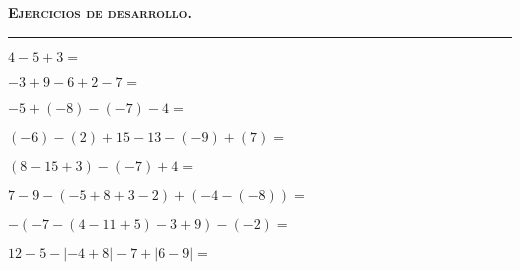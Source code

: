 \documentclass[spanish,letterpaper, 12pt, addpoints, answers]{exam}
\begin{document}
\parbox{16cm}{
{\textsc{\textbf{Ejercicios de desarrollo.}}}}

\vspace{0.15in}
\hrule 
\begin{questions}


\question[3]  $4-5+3=$\\
\vspace{1cm}

\question[3]  $-3+9-6+2-7=$\\
\vspace{1cm}

\question[3]  $-5+(-8)-(-7)-4=$\\
\vspace{2cm}

\question[3]  $(-6)-(2)+15-13-(-9)+(7)=$\\
\vspace{2cm}

\question[3]  $(8-15+3)-(-7)+4=$\\
\vspace{3cm}

\question[3]  $7-9-(-5+8+3-2)+(-4-(-8))=$\\
\vspace{4cm}

\question[3]  $-(-7-(4-11+5)-3+9)-(-2)=$\\
\vspace{4cm}

\question[3]  $12-5-|-4+8|-7+|6-9|=$\\
\vspace{4cm}

\end{questions}
\end{document}
